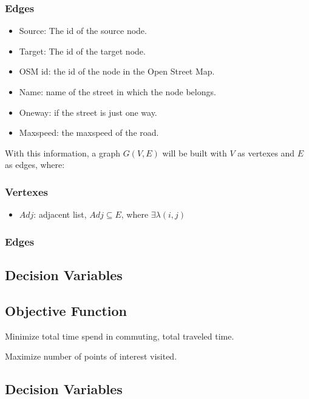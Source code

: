 \documentclass{article}
\begin{document}
    \subsubsection*{Edges}
    \begin{itemize}
        \item Source: The id of the source node. 
        \item Target: The id of the target node. 
        \item OSM id: the id of the node in the Open Street Map. 
        \item Name: name of the street in which the node belongs. 
        \item Oneway: if the street is just one way.
        \item Maxspeed: the maxspeed of the road.
    \end{itemize}
    
    With this information, a graph $G(V,E)$ will be built with $V$ as vertexes and $E$ as edges, where:
    \subsubsection*{Vertexes}
    \begin{itemize}
        \item $Adj$: adjacent list, $Adj \subseteq E$, where $\exists \lambda(i,j)$  $$
    \end{itemize} 
    
    \subsubsection*{Edges} 
    
        
\subsection*{Decision Variables}

\subsection*{Objective Function}

Minimize total time spend in commuting, total traveled time. \par
Maximize number of points of interest visited.

\subsection*{Decision Variables}
\end{document}
